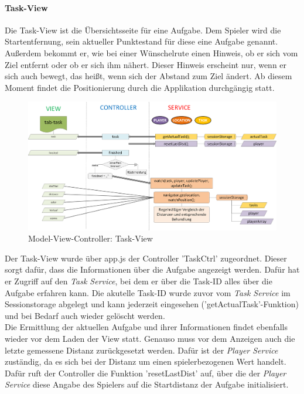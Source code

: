 \paragraph{Task-View}
%
%
Die Task-View ist die Übersichtsseite für eine Aufgabe. Dem Spieler wird die Startentfernung, sein aktueller Punktestand für diese eine Aufgabe genannt. Außerdem bekommt er, wie bei einer Wünschelrute einen Hinweis, ob er sich vom Ziel entfernt oder ob er sich ihm nähert. Dieser Hinweis erscheint nur, wenn er sich auch bewegt, das heißt, wenn sich der Abstand zum Ziel ändert. Ab diesem Moment findet die Positionierung durch die Applikation durchgängig statt.
%
%
\begin{figure}[h]
\centering
\includegraphics[width=1\textwidth]{ref/images/05-task-tab.png}
\caption[Model-View-Controller: Task-View]{Model-View-Controller: Task-View}
\label{fig:MVC:Task-View}
\end{figure}
%
%


Der Task-View wurde über app.js der Controller 'TaskCtrl' zugeordnet. Dieser sorgt dafür, dass die Informationen über die Aufgabe angezeigt werden. Dafür hat er Zugriff auf den \emph{Task Service}, bei dem er über die Task-ID alles über die Aufgabe erfahren kann. Die akutelle Task-ID wurde zuvor vom \emph{Task Service} im Sessionstorage abgelegt und kann jederzeit eingesehen ('getActualTask'-Funktion) und bei Bedarf auch wieder gelöscht werden.
\\
Die Ermittlung der aktuellen Aufgabe und ihrer Informationen findet ebenfalls wieder vor dem Laden der View statt. Genauso muss vor dem Anzeigen auch die letzte gemessene Distanz zurückgesetzt werden. Dafür ist der \emph{Player Service} zuständig, da es sich bei der Distanz um einen spielerbezogenen Wert handelt. Dafür ruft der Controller die Funktion 'resetLastDist' auf, über die der \emph{Player Service} diese Angabe des Spielers auf die Startdistanz der Aufgabe initialisiert.


